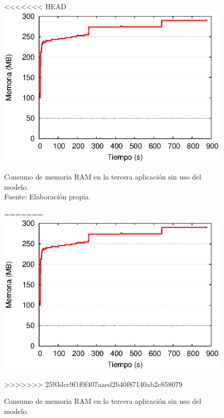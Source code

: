 \begin{figure}[!ht]
<<<<<<< HEAD
	\centering
	\captionsetup{justification=centering}
    \includegraphics[scale=0.7]{images/exp/app3/sm/fisical/consumeRAM.eps}
    \caption[Consumo de memoria RAM en la tercera aplicación sin uso del modelo.]{Consumo de memoria RAM en la tercera aplicación sin uso del modelo.\\Fuente: Elaboración propia.}
=======
\centering
    \includegraphics[scale=0.75]{images/exp/app3/sm/fisical/consumeRAM.eps}
    \caption{Consumo de memoria RAM en la tercera aplicaci\'on sin uso del modelo.}
>>>>>>> 2593dcc9f1f0f407aaed2b40f87140ab2e858079
    \label{fig:app3-consumeRAM-sm}
\end{figure}


